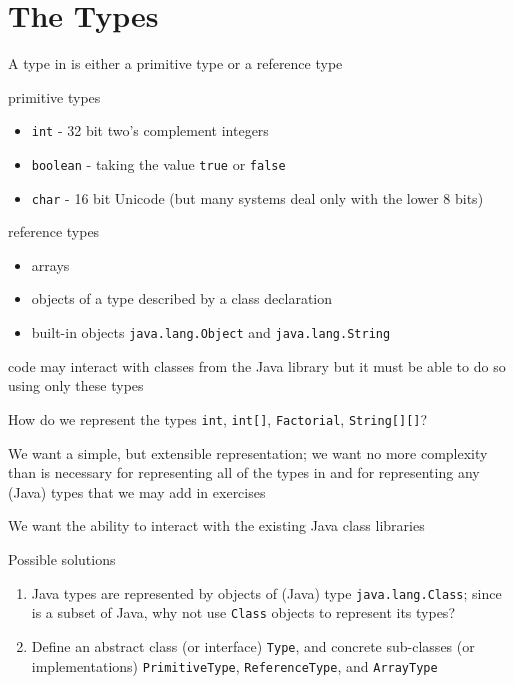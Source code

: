 \documentclass[8pt,a4paper,compress]{beamer}
\begin{document}
\section{The \protect\jmm Types}
\begin{frame}[fragile]
\pause

A type in \jmm is either a primitive type or a reference type

\pause
\bigskip

\jmm primitive types
\begin{itemize}
\pause
\item \lstinline{int} - 32 bit two's complement integers
\pause
\item \lstinline{boolean} - taking the value \lstinline{true} or \lstinline{false}
\pause
\item \lstinline{char} - 16 bit Unicode (but many systems deal only with the lower 8 bits)
\end{itemize}

\pause
\bigskip

\jmm reference types
\begin{itemize}
\pause
\item arrays
\pause
\item objects of a type described by a class declaration
\pause
\item built-in objects \lstinline{java.lang.Object} and \lstinline{java.lang.String}
\end{itemize}

\pause
\bigskip

\jmm code may interact with classes from the Java library but it must be able to do so using only these types
\end{frame}

\begin{frame}[fragile]
\pause

How do we represent the types \lstinline{int}, \lstinline{int[]}, \lstinline{Factorial}, \lstinline{String[][]}?  

\pause
\bigskip

We want a simple, but extensible representation; we want no more complexity than is necessary for representing all of the types in \jmm and for representing any (Java) types that we may add in exercises

\pause
\bigskip

We want the ability to interact with the existing Java class libraries

\pause
\bigskip

Possible solutions
\begin{enumerate}
\pause
\item Java types are represented by objects of (Java) type \lstinline{java.lang.Class}; since \jmm is a subset of Java, why not use \lstinline{Class} objects to represent its types? 
\pause
\item Define an abstract class (or interface) \lstinline{Type}, and concrete sub-classes (or implementations) \lstinline{PrimitiveType}, \lstinline{ReferenceType}, and \lstinline{ArrayType}
\end{enumerate}
\end{frame}
\end{document}
